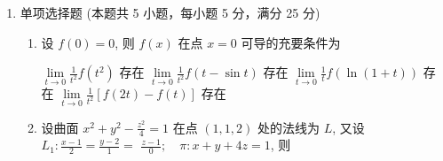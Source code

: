 \begin{enumerate}
{\begin{enumerate}
	\item
	$2\sqrt{14}$。最大方向微商（方向导数）的值等于梯度的模。
	$\operatorname{grad}u=(2x,4y,6z)$，在 $(1,1,-1)$ 处为 $(2,4,-6)$，故最大值为
	\[
	\left|\operatorname{grad}u\right|=\sqrt{2^{2}+4^{2}+(-6)^{2}}=\sqrt{56}=2\sqrt{14} ,
	\]
	方向为 $(1,2,-3)$ 的单位向量方向。

	\item
	$\sqrt{3}$。令 $t=x^{2}$，级数化为 $\sum\limits_{n=1}^{\infty}\frac{t^{n}}{2^{n}+3^{n}}$。由
	\[
	\sqrt[n]{\frac{1}{2^{n}+3^{n}}}=\frac{1}{3}\sqrt[n]{\frac{1}{1+(2/3)^{n}}}\longrightarrow\frac13
	\]
	知它关于 $t$ 的收敛半径为 $3$，即 $x^{2}<3$。故原级数当 $|x|<\sqrt3$ 时收敛、
	$|x|>\sqrt3$ 时发散，收敛半径 $R=\sqrt3$。

	\item
	$y=x(C+\ln|x|)$。这是一阶线性方程 $y^{\prime}-\frac1xy=1$，取积分因子 $\frac1x$，得
	\[
	\left(\frac{y}{x}\right)^{\prime}=\frac{xy^{\prime}-y}{x^{2}}=\frac1x ,
	\]
	积分得 $\frac{y}{x}=\ln|x|+C$，即 $y=x(C+\ln|x|)$。

	\par\vspace{1mm}\noindent
	\textbf{注：}{\kaishu
	原题面印作 $y^{\prime}+\frac1x=1$，其中根本不含未知函数 $y$，
	直接积分只得 $y=x-\ln|x|+C$，与所给答案 $y=x(C+\ln|x|)$ 不符。
	由答案反推，原方程应为 $y^{\prime}-\frac{y}{x}=1$（已代入验证满足），故据此更正题面。
	}\par
\end{enumerate}
}

\item
单项选择题 (本题共 5 小题，每小题 5 分，满分 25 分)
\begin{enumerate}
	\item
	设 $f(0)=0$, 则 $f(x)$ 在点 $x=0$ 可导的充要条件为  
	
	
\fourchoices
{$\lim\limits _{t \rightarrow 0} \frac{1}{t^{2}} f\left(t^{2}\right)$ 存在}
{$\lim\limits _{t \rightarrow 0} \frac{1}{t^{2}} f(t-\sin t)$ 存在}
{$\lim\limits _{t \rightarrow 0} \frac{1}{t} f(\ln (1+t))$ 存在}
{$\lim\limits _{t \rightarrow 0} \frac{1}{t^{2}}[f(2 t)-f(t)]$ 存在}

\item 
设曲面 $x^{2}+y^{2}-\frac{z^{2}}{4}=1$ 在点 $(1,1,2)$ 处的法线为 $L$, 又设 $L_{1}: \frac{x-1}{2}=\frac{y-2}{1}=$ $\frac{z-1}{0} ; \quad \pi: x+y+4 z=1$, 则  



\end{enumerate}
\end{enumerate}
